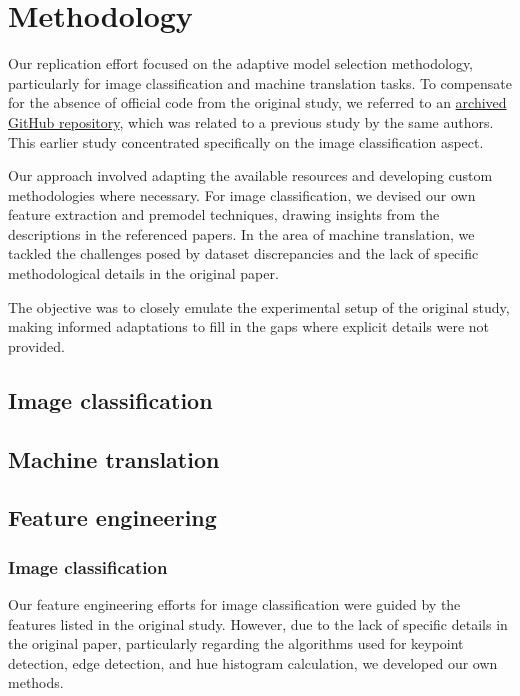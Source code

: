 \section{Methodology}

Our replication effort focused on the adaptive model selection methodology, particularly for image classification and machine translation tasks. To compensate for the absence of official code from the original study, we referred to an \href{https://github.com/qwerybot/Adaptive_Deep_Learning}{archived GitHub repository}, which was related to a previous study\supercite{taylor2018adaptive} by the same authors. This earlier study concentrated specifically on the image classification aspect.

Our approach involved adapting the available resources and developing custom methodologies where necessary. For image classification, we devised our own feature extraction and premodel techniques, drawing insights from the descriptions in the referenced papers. In the area of machine translation, we tackled the challenges posed by dataset discrepancies and the lack of specific methodological details in the original paper.

The objective was to closely emulate the experimental setup of the original study, making informed adaptations to fill in the gaps where explicit details were not provided.

\subsection{Image classification}

\subsection{Machine translation}

\subsection{Feature engineering}
\subsubsection{Image classification}

Our feature engineering efforts for image classification were guided by the features listed in the original study. However, due to the lack of specific details in the original paper, particularly regarding the algorithms used for keypoint detection, edge detection, and hue histogram calculation, we developed our own methods.

